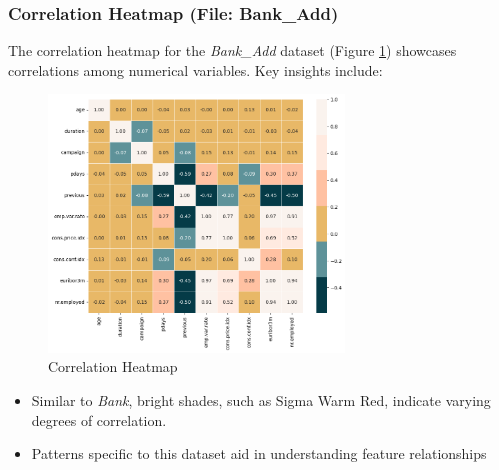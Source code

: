\documentclass{article}
\begin{document}
\subsubsection{Correlation Heatmap (File: Bank\_Add)}
The correlation heatmap for the \textit{Bank\_Add} dataset (Figure \ref{fig:heatmap_bank_add}) showcases correlations among numerical variables. Key insights include:
\begin{figure}[h]
                \centering
                \includegraphics[width=0.7\textwidth]{data/bank_marketing/pic/Bank_Add_Corr.png}
                \caption{Correlation Heatmap}
                \label{fig:heatmap_bank_add}
            \end{figure}
        \begin{itemize}
            \item Similar to \textit{Bank}, bright shades, such as Sigma Warm Red, indicate varying degrees of correlation.
            \item Patterns specific to this dataset aid in understanding feature relationships
            \vspace{300pt}
        \end{itemize}
\end{document}
